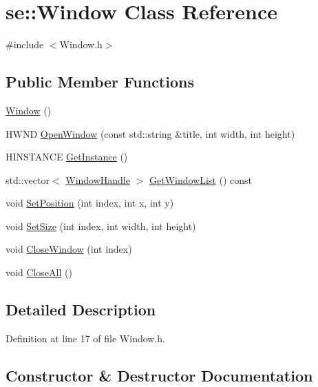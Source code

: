 \hypertarget{classse_1_1_window}{}\section{se\+:\+:Window Class Reference}
\label{classse_1_1_window}


{\ttfamily \#include $<$Window.\+h$>$}

\subsection*{Public Member Functions}
\begin{DoxyCompactItemize}
\item 
\mbox{\hyperlink{classse_1_1_window_a903d67c495507f0ece8d2976a33b8540}{Window}} ()
\item 
H\+W\+ND \mbox{\hyperlink{classse_1_1_window_a0bc98ce202ef1c431fe2780d53dbe7da}{Open\+Window}} (const std\+::string \&title, int width, int height)
\item 
H\+I\+N\+S\+T\+A\+N\+CE \mbox{\hyperlink{classse_1_1_window_af85337c4cc5eae56412a5bbcbf471ae6}{Get\+Instance}} ()
\item 
std\+::vector$<$ \mbox{\hyperlink{structse_1_1_window_handle}{Window\+Handle}} $>$ \mbox{\hyperlink{classse_1_1_window_a3469863d327e48f06837f772d066e1e7}{Get\+Window\+List}} () const
\item 
void \mbox{\hyperlink{classse_1_1_window_a12c371c25615c9d4744a961dab9d949c}{Set\+Position}} (int index, int x, int y)
\item 
void \mbox{\hyperlink{classse_1_1_window_ac5e7a7985934606074e9c65f83f45260}{Set\+Size}} (int index, int width, int height)
\item 
void \mbox{\hyperlink{classse_1_1_window_aab3319947ce4e9cd78f16cd9be9481e5}{Close\+Window}} (int index)
\item 
void \mbox{\hyperlink{classse_1_1_window_aa36e57777577f2b0cf355461b3b0f9a3}{Close\+All}} ()
\end{DoxyCompactItemize}


\subsection{Detailed Description}


Definition at line 17 of file Window.\+h.



\subsection{Constructor \& Destructor Documentation}
\mbox{\label{classse_1_1_window_a903d67c495507f0ece8d2976a33b8540}} 
